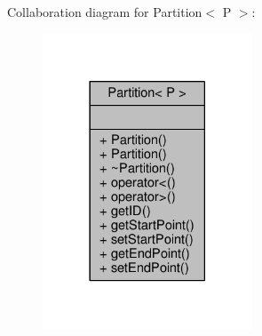 Collaboration diagram for Partition$<$ P $>$\+:
\nopagebreak
\begin{figure}[H]
\begin{center}
\leavevmode
\includegraphics[width=177pt]{classPartition__coll__graph}
\end{center}
\end{figure}
